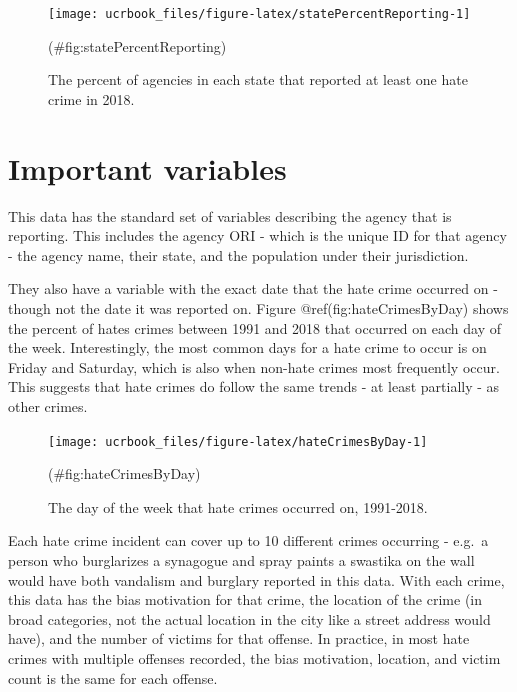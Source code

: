 \documentclass[
  12pt,
  openany]{book}
\begin{document}
\begin{figure}

{\centering \texttt{[image: ucrbook\_files/figure-latex/statePercentReporting-1]} 

}

\caption{The percent of agencies in each state that reported at least one hate crime in 2018.}(\#fig:statePercentReporting)
\end{figure}

\hypertarget{important-variables-6}{%
\section{Important variables}\label{important-variables-6}}

This data has the standard set of variables describing the agency that is reporting. This includes the agency ORI - which is the unique ID for that agency - the agency name, their state, and the population under their jurisdiction.

They also have a variable with the exact date that the hate crime occurred on - though not the date it was reported on. Figure @ref(fig:hateCrimesByDay) shows the percent of hates crimes between 1991 and 2018 that occurred on each day of the week. Interestingly, the most common days for a hate crime to occur is on Friday and Saturday, which is also when non-hate crimes most frequently occur. This suggests that hate crimes do follow the same trends - at least partially - as other crimes.

\begin{figure}

{\centering \texttt{[image: ucrbook\_files/figure-latex/hateCrimesByDay-1]} 

}

\caption{The day of the week that hate crimes occurred on, 1991-2018.}(\#fig:hateCrimesByDay)
\end{figure}

Each hate crime incident can cover up to 10 different crimes occurring - e.g.~a person who burglarizes a synagogue and spray paints a swastika on the wall would have both vandalism and burglary reported in this data. With each crime, this data has the bias motivation for that crime, the location of the crime (in broad categories, not the actual location in the city like a street address would have), and the number of victims for that offense. In practice, in most hate crimes with multiple offenses recorded, the bias motivation, location, and victim count is the same for each offense.
\end{document}

